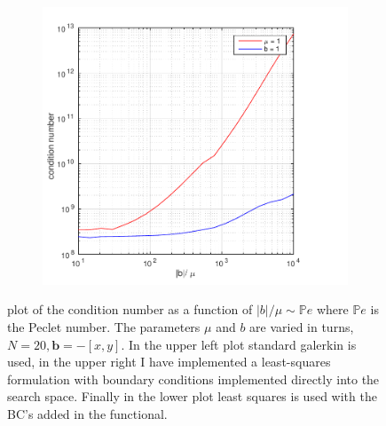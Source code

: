\begin{figure}[h!]
\begin{subfigure}[b]{0.48\textwidth}
  \end{subfigure}
  \begin{subfigure}[b]{0.48\textwidth}
		\includegraphics[width=\textwidth]{Figures/Spec-LS_difftrans_ConditionNumber_DirFunc.pdf}
  \end{subfigure}
  \vspace{-0.1\baselineskip}
	\caption{plot of the condition number as a function of $|b|/\mu \sim \mathbb{P}e$ where $\mathbb{P}e$ is the Peclet number. The parameters $\mu$ and $b$ are varied in turns, $N=20,\mathbf{b} = -[x,y]$. In the upper left plot standard galerkin is used, in the upper right I have implemented a least-squares formulation with boundary conditions implemented directly into the search space. Finally in the lower plot least squares is used with the BC's added in the functional.}
  \label{fig:CondDifftransSpec}
\end{figure}
%
%
